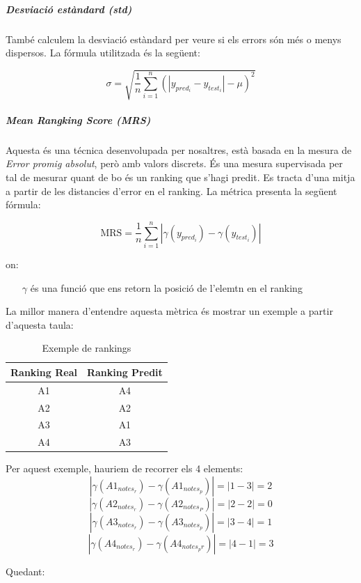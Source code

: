 \documentclass[12pt,a4paper,catalan]{article}
\begin{document}
\subparagraph{Desviació estàndard (std)}
També calculem la desviació estàndard per veure si els errors són més o menys dispersos. La fórmula utilitzada és la següent:

$$ \sigma = \sqrt{ \frac{1}{n} \sum_{i=1}^n (\left| y_{pred_i}-y_{test_i}\right| - \mu)^2 } $$

\subparagraph{\textit{Mean Rangking Score (MRS)}}
Aquesta és una técnica desenvolupada per nosaltres, està basada en la mesura de \textit{Error promig absolut}, però amb valors discrets. És una mesura supervisada per tal de mesurar quant de bo és un ranking que s'hagi predit. Es tracta d'una mitja a partir de les distancies d'error en el ranking. La métrica presenta la següent fórmula:

$$ \mathrm{MRS} = \frac{1}{n}\sum_{i=1}^n \left| \gamma(y_{pred_i}) -  \gamma(y_{test_i})\right| $$

on:
\begin{itemize}[leftmargin=.5in]
	\item [$\gamma$] és una funció que ens retorn la posició de l'elemtn en el ranking
\end{itemize}

\newpage

La millor manera d'entendre aquesta mètrica és mostrar un exemple a partir d'aquesta taula:

\begin{table}[h]
\centering
\begin{tabular}{@{}cc@{}}
\toprule
Ranking Real & Ranking Predit \\ \midrule
A1           & A4             \\
A2           & A2             \\
A3           & A1             \\
A4           & A3             \\ \bottomrule
\end{tabular}
\caption{Exemple de rankings}
\end{table}

Per aquest exemple, hauriem de recorrer els 4 elements:
	$$\left|\gamma(A1_{notes_r}) - \gamma(A1_{notes_p})\right| = \left| 1 - 3 \right| = 2$$
	$$\left|\gamma(A2_{notes_r}) - \gamma(A2_{notes_P})\right| = \left| 2 - 2 \right| = 0$$
	$$\left|\gamma(A3_{notes_r}) - \gamma(A3_{notes_p})\right| = \left| 3 - 4 \right| = 1$$
	$$\left|\gamma(A4_{notes_r}) - \gamma(A4_{notes_pr})\right| = \left| 4 - 1 \right| = 3$$

Quedant:
\end{document}
